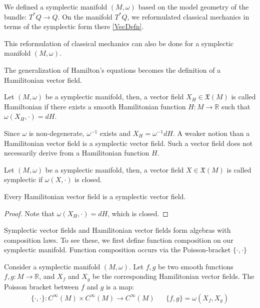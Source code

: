 We defined a symplectic manifold $(M, \omega)$ based on the model geometry of the bundle: $T^{*} Q \to Q$. On the manifold $T^{*} Q$, we reformulated classical mechanics in terms of the symplectic form there \ref{VecDefn}.

\begin{remark}
This reformulation of classical mechanics can also be done for a symplectic manifold $(M, \omega)$. 
\end{remark}

The generalization of Hamilton's equations becomes the definition of a Hamilitonian vector field.

\begin{defn}
\label{HamilitonianVectorField}
Let $(M, \omega)$ be a symplectic manifold, then, a vector field $X_{H} \in \mathfrak{X}(M)$ is called Hamiltonian if there exists a smooth Hamilitonian function $H: M \to \mathbb{R}$ such that $\omega(X_{H}, \cdot) = dH$.
\end{defn}

\noindent Since $\omega$ is non-degenerate, $\omega^{-1}$ exists and 
$X_{H} = \omega^{-1} dH$. A weaker notion than a Hamilitonian vector field is a symplectic vector field. Such a vector field does not necessarily derive from a Hamilitonian function $H$. 

\begin{defn}
Let $(M, \omega)$ be a symplectic manifold, then, a vector field $X \in \mathfrak{X}(M)$ is called symplectic if $\omega(X, \cdot)$ is closed. 
\end{defn}

\begin{lemma}
Every Hamilitonian vector field is a symplectic vector field.
\end{lemma}

\begin{proof}
Note that $\omega(X_{H}, \cdot) = dH$, which is closed. 
\end{proof}

\begin{remark}
Symplectic vector fields and Hamilitonian vector fields form algebras with composition laws. To see these, we first define function composition on our symplectic manifold. Function composition occurs via the Poisson-bracket $\{\cdot, \cdot \}$
\end{remark}  

\begin{defn}
\label{PoissonBracket}
Consider a symplectic manifold $(M, \omega)$. Let $f, g$ be two smooth functions $f, g: M \to \mathbb{R}$, and $X_{f}$ and $X_{g}$ be the corresponding Hamilitonian vector fields. The Poisson bracket between $f$ and $g$ is a map: 
\begin{align}
\{\cdot, \cdot\}: C^{\infty}(M) \times C^{\infty}(M) \to C^{\infty}(M) && \{f, g \} = \omega(X_{f}, X_{g})
\end{align}

\end{defn}

